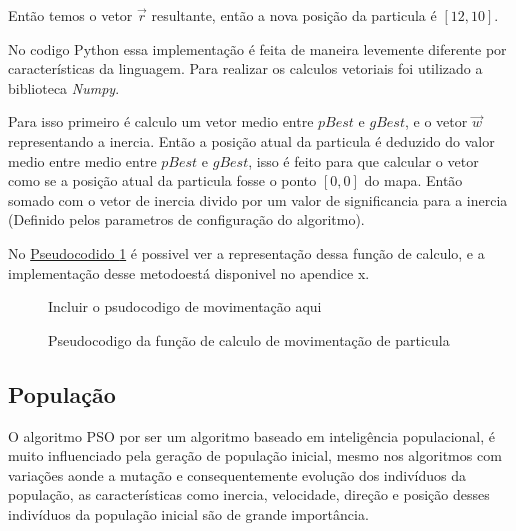                 \noindent Então temos o vetor $\vec r$ resultante, então a nova posição da particula é $[12,10]$.
                
                No codigo Python essa implementação é feita de maneira levemente diferente por características da linguagem. Para realizar os calculos vetoriais foi utilizado a biblioteca \textit{Numpy}. \newline
                
                Para isso primeiro é calculo um vetor medio entre $pBest$ e $gBest$, e o vetor $\vec w$ representando a inercia. \newline
                Então a posição atual da particula é deduzido do valor medio entre medio entre $pBest$ e $gBest$, isso é feito para que calcular o vetor como se a posição atual da particula fosse o ponto $[0,0]$ do mapa.\newline
                Então somado com o vetor de inercia divido por um valor de significancia para a inercia (Definido pelos parametros de configuração do algoritmo).\newline

                No \hyperref[cod:new-posicao]{Pseudocodido \ref{cod:new-posicao}} é possivel ver a representação dessa função de calculo, e a implementação desse metodoestá disponivel no apendice x.
                
                \begin{figure}[h]
                    \centering
                    \small{Incluir o psudocodigo de movimentação aqui}
                    \caption{Pseudocodigo da função de calculo de movimentação de particula}
                    \label{cod:new-posicao}
                \end{figure}






    \subsection{População}
        O algoritmo PSO por ser um algoritmo baseado em inteligência populacional, é muito influenciado pela geração de população inicial, mesmo nos algoritmos com variações aonde a mutação e consequentemente evolução dos indivíduos da população, as características como inercia, velocidade, direção e posição desses indivíduos da população inicial são de grande importância.\newline


